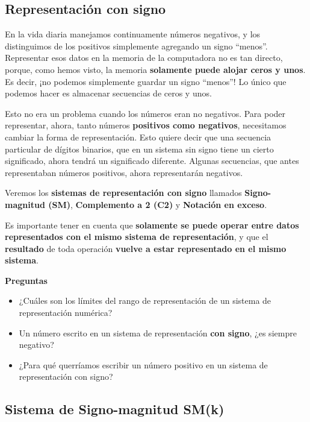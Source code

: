 \documentclass[spanish,A4,]{article}
\begin{document}
\subsection{Representación con signo}\label{representaciuxf3n-con-signo}

En la vida diaria manejamos continuamente números negativos, y los
distinguimos de los positivos simplemente agregando un signo ``menos''.
Representar esos datos en la memoria de la computadora no es tan
directo, porque, como hemos visto, la memoria \textbf{solamente puede
alojar ceros y unos}. Es decir, ¡no podemos simplemente guardar un signo
``menos''! Lo único que podemos hacer es almacenar secuencias de ceros y
unos.

Esto no era un problema cuando los números eran no negativos. Para poder
representar, ahora, tanto números \textbf{positivos como negativos},
necesitamos cambiar la forma de representación. Esto quiere decir que
una secuencia particular de dígitos binarios, que en un sistema sin
signo tiene un cierto significado, ahora tendrá un significado
diferente. Algunas secuencias, que antes representaban números
positivos, ahora representarán negativos.

Veremos los \textbf{sistemas de representación con signo} llamados
\textbf{Signo-magnitud (SM)}, \textbf{Complemento a 2 (C2)} y
\textbf{Notación en exceso}.

Es importante tener en cuenta que \textbf{solamente se puede operar
entre datos representados con el mismo sistema de representación}, y que
el \textbf{resultado} de toda operación \textbf{vuelve a estar
representado en el mismo sistema}.

\textbf{Preguntas}

\begin{itemize}
\itemsep1pt\parskip0pt
\item
  ¿Cuáles son los límites del rango de representación de un sistema de
  representación numérica?
\item
  Un número escrito en un sistema de representación \textbf{con signo},
  ¿es siempre negativo?
\item
  ¿Para qué querríamos escribir un número positivo en un sistema de
  representación con signo?
\end{itemize}

\subsection{Sistema de Signo-magnitud
SM(k)}\label{sistema-de-signo-magnitud-smk}
\end{document}

